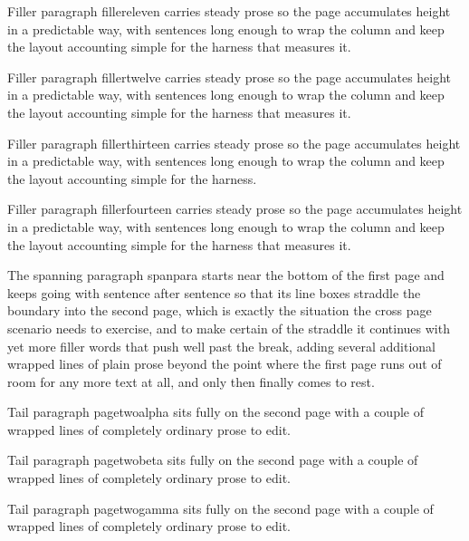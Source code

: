 \documentclass{article}
\begin{document}
Filler paragraph fillereleven carries steady prose so the page accumulates height in a
predictable way, with sentences long enough to wrap the column and keep the layout
accounting simple for the harness that measures it.

Filler paragraph fillertwelve carries steady prose so the page accumulates height in a
predictable way, with sentences long enough to wrap the column and keep the layout
accounting simple for the harness that measures it.

Filler paragraph fillerthirteen carries steady prose so the page accumulates height in
a predictable way, with sentences long enough to wrap the column and keep the layout
accounting simple for the harness.

Filler paragraph fillerfourteen carries steady prose so the page accumulates height in
a predictable way, with sentences long enough to wrap the column and keep the layout
accounting simple for the harness that measures it.

The spanning paragraph spanpara starts near the bottom of the first page and keeps
going with sentence after sentence so that its line boxes straddle the boundary into
the second page, which is exactly the situation the cross page scenario needs to
exercise, and to make certain of the straddle it continues with yet more filler
words that push well past the break, adding several additional wrapped lines of
plain prose beyond the point where the first page runs out of room for any more
text at all, and only then finally comes to rest.

Tail paragraph pagetwoalpha sits fully on the second page with a couple of wrapped
lines of completely ordinary prose to edit.

Tail paragraph pagetwobeta sits fully on the second page with a couple of wrapped
lines of completely ordinary prose to edit.

Tail paragraph pagetwogamma sits fully on the second page with a couple of wrapped
lines of completely ordinary prose to edit.
\end{document}
